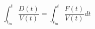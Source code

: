 \begin{equation}
\int_{t_{in}}^t \frac{D(t)}{V(t)}=\int_{t_{in}}^t \frac{F(t)}{V(t)} dt
\end{equation}
